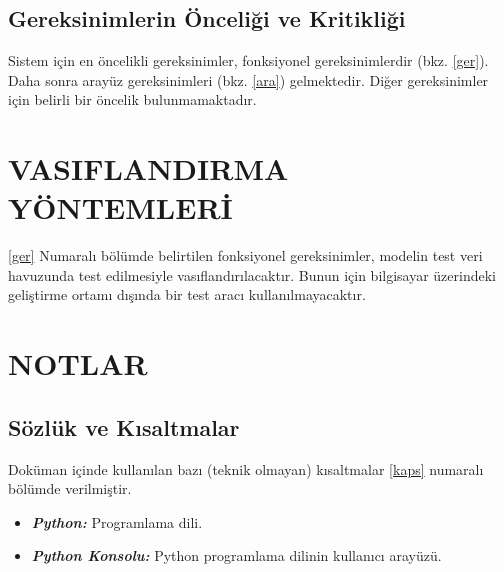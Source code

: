 \documentclass[12pt,a4paper]{article}
\begin{document}
   \subsection{Gereksinimlerin Önceliği ve Kritikliği}
   Sistem için en öncelikli gereksinimler, fonksiyonel gereksinimlerdir (bkz. \ref{ger}). Daha sonra arayüz gereksinimleri (bkz. \ref{ara}) gelmektedir. Diğer gereksinimler için belirli bir öncelik bulunmamaktadır.

   \section{VASIFLANDIRMA YÖNTEMLERİ}
   \ref{ger} Numaralı bölümde belirtilen fonksiyonel gereksinimler, modelin test veri havuzunda  test edilmesiyle vasıflandırılacaktır. Bunun için bilgisayar üzerindeki geliştirme ortamı dışında bir test aracı kullanılmayacaktır. 

   \section{NOTLAR}
   \subsection{Sözlük ve Kısaltmalar}
   Doküman içinde kullanılan bazı (teknik olmayan) kısaltmalar \ref{kaps} numaralı bölümde verilmiştir.
   \begin{itemize}
      \item \textbf{\textit{Python:}} Programlama dili.
      \item \textbf{\textit{Python Konsolu:}} Python programlama dilinin kullanıcı arayüzü.
   \end{itemize}

   \newpage
   \appendix
\end{document}
